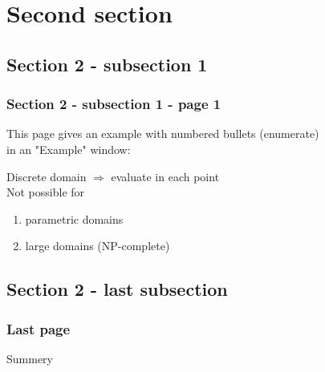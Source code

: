 \documentclass{beamer}
\begin{document}

\section{Second section}

\subsection{Section 2 - subsection 1}

\begin{frame}\frametitle{\textbf{\LARGE{\textrm{Section 2 - subsection 1 - page 1}}}}
    \begin{problem}
        This page gives an example with numbered bullets (enumerate)\\
        in an "Example" window:\\
    \end{problem}

    \begin{example}
        Discrete domain $\Rightarrow$ evaluate in each point \\
        Not possible for \\
        \begin{enumerate}
            \item <1-> parametric domains
            \item <2-> large domains (NP-complete)
        \end{enumerate}
    \end{example}
\end{frame}


\subsection[]{Section 2 - last subsection}

\begin{frame}\frametitle{\textbf{\LARGE{\textrm{Last page}}}}
    \begin{block}{Summery}
    \end{block}
\end{frame}
\end{document}

